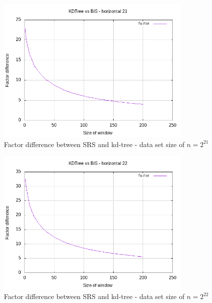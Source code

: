 \begin{figure}[h]
    \centering
    \includegraphics[width = 0.85\textwidth]{pictures/analysis/smalls/hori_fac_21.png}
    \caption{Factor difference between SRS and kd-tree - data set size of $n=2^{21}$}\label{fig:small_hori_fac_21}
\end{figure}

\begin{figure}[h]
    \centering
    \includegraphics[width = 0.85\textwidth]{pictures/analysis/smalls/hori_fac_22.png}
    \caption{Factor difference between SRS and kd-tree - data set size of $n=2^{22}$}\label{fig:small_hori_fac_22}
\end{figure}

